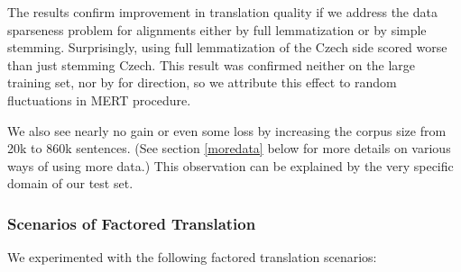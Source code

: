 \documentclass[11pt]{report}
\theoremstyle{plain}
\begin{document}
{{The results confirm improvement in translation quality if we address the data
sparseness problem for alignments either by full lemmatization or by simple
stemming.  Surprisingly, using full lemmatization of the Czech side scored worse
than just stemming Czech. This result was confirmed neither on the large
training set, nor by  for \toen{} direction, so
we attribute this effect to random fluctuations in MERT procedure.

We also see nearly no gain or even some loss by increasing the corpus size
from 20k to 860k sentences. (See section \ref{moredata}
below for more details on various ways of using more data.)
This observation can be explained by the very specific
domain of our test set.


\subsubsection{Scenarios of Factored Translation \tocs{}}



We experimented with the following factored translation scenarios:


\piccaptioninside
{}

}}
\end{document}

